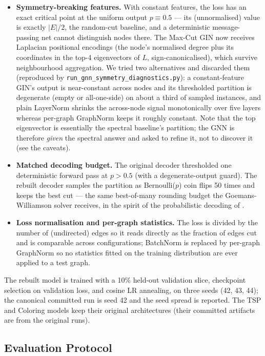 \documentclass[11pt]{article}
\begin{document}
\begin{itemize}
    \item \textbf{Symmetry-breaking features.} With constant features, the loss has an exact critical point at the uniform output $p \equiv 0.5$ --- its (unnormalised) value is exactly $|E|/2$, the random-cut baseline, and a deterministic message-passing net cannot distinguish nodes there. The Max-Cut GIN now receives Laplacian positional encodings (the node's normalised degree plus its coordinates in the top-4 eigenvectors of $L$, sign-canonicalised), which survive neighbourhood aggregation. We tried two alternatives and discarded them (reproduced by \texttt{run\_gnn\_symmetry\_diagnostics.py}): a constant-feature GIN's output is near-constant across nodes and its thresholded partition is degenerate (empty or all-one-side) on about a third of sampled instances, and plain LayerNorm shrinks the across-node signal monotonically over five layers whereas per-graph GraphNorm keeps it roughly constant. Note that the top eigenvector is essentially the spectral baseline's partition; the GNN is therefore \emph{given} the spectral answer and asked to refine it, not to discover it (see the caveats).
    \item \textbf{Matched decoding budget.} The original decoder thresholded one deterministic forward pass at $p>0.5$ (with a degenerate-output guard). The rebuilt decoder samples the partition as Bernoulli($p$) coin flips 50 times and keeps the best cut --- the same best-of-many rounding budget the Goemans-Williamson solver receives, in the spirit of the probabilistic decoding of \cite{karalias2020erdos}.
    \item \textbf{Loss normalisation and per-graph statistics.} The loss is divided by the number of (undirected) edges so it reads directly as the fraction of edges cut and is comparable across configurations; BatchNorm is replaced by per-graph GraphNorm so no statistics fitted on the training distribution are ever applied to a test graph.
\end{itemize}

The rebuilt model is trained with a 10\% held-out validation slice, checkpoint selection on validation loss, and cosine LR annealing, on three seeds (42, 43, 44); the canonical committed run is seed 42 and the seed spread is reported.
The TSP and Coloring models keep their original architectures (their committed artifacts are from the original runs).

\subsection{Evaluation Protocol}
\end{document}
